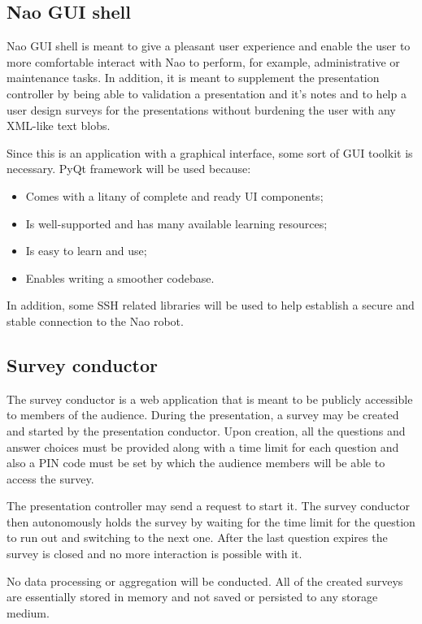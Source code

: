 \documentclass[12pt, fleqn, a4paper]{article}
\begin{document}
\subsection{Nao GUI shell}
Nao GUI shell is meant to give a pleasant user experience and enable the user to more comfortable interact with Nao to perform, for example, administrative or maintenance tasks. In addition, it is meant to supplement the presentation controller by being able to validation a presentation and it's notes and to help a user design surveys for the presentations without burdening the user with any XML-like text blobs.\par
Since this is an application with a graphical interface, some sort of GUI toolkit is necessary. PyQt framework will be used because:
\begin{itemize}
	\item Comes with a litany of complete and ready UI components;
	\item Is well-supported and has many available learning resources;
	\item Is easy to learn and use;
	\item Enables writing a smoother codebase.
\end{itemize}
In addition, some SSH related libraries will be used to help establish a secure and stable connection to the Nao robot.
\subsection{Survey conductor}
The survey conductor is a web application that is meant to be publicly accessible to members of the audience. During the presentation, a survey may be created and started by the presentation conductor. Upon creation, all the questions and answer choices must be provided along with a time limit for each question and also a PIN code must be set by which the audience members will be able to access the survey.\par
The presentation controller may send a request to start it. The survey conductor then autonomously holds the survey by waiting for the time limit for the question to run out and switching to the next one. After the last question expires the survey is closed and no more interaction is possible with it.\par
No data processing or aggregation will be conducted. All of the created surveys are essentially stored in memory and not saved or persisted to any storage medium.
\end{document}
